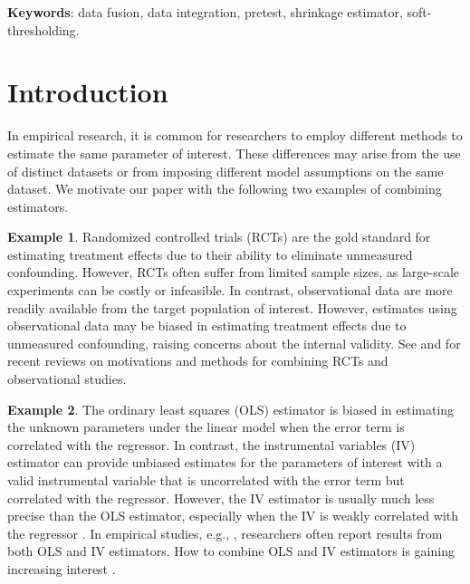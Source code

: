 \documentclass[11pt]{article}
\numberwithin{equation}{section}
\theoremstyle{definition}
\newtheorem{example}{Example}[section]
\begin{document}
{\bf Keywords}: data fusion, data integration, pretest, shrinkage estimator, soft-thresholding.


\section{Introduction}

In empirical research, it is common for researchers to employ different methods to estimate the same parameter of interest. These differences may arise from the use of distinct datasets or from imposing different model assumptions on the same dataset. We motivate our paper with the following two examples of combining estimators.
\begin{example}\label{ex:treatment}
  Randomized controlled trials (RCTs) are the gold standard for estimating treatment effects due to their ability to eliminate unmeasured confounding. However, RCTs often suffer from limited sample sizes, as large-scale experiments can be costly or infeasible. In contrast, observational data are more readily available from the target population of interest. However, estimates using observational data may be biased in estimating treatment effects due to unmeasured confounding, raising concerns about the internal validity. See \cite{brantner2023methods} and \cite{colnet2024causal} for recent reviews on motivations and methods for combining RCTs and observational studies.
\end{example}

\begin{example}\label{ex:regression}
  The ordinary least squares (OLS) estimator is biased in estimating the unknown parameters under the linear model when the error term is correlated with the regressor. In contrast, the instrumental variables (IV) estimator can provide unbiased estimates for the parameters of interest with a valid instrumental variable that is uncorrelated with the error term but correlated with the regressor. However, the IV estimator is usually much less precise than the OLS estimator, especially when the IV is weakly correlated with the regressor \citep{bound1995problems}. In empirical studies, e.g., \cite{angrist1991does}, researchers often report results from both OLS and IV estimators. How to combine OLS and IV estimators is gaining increasing interest \citep{armstrong2025adapting}.
\end{example}
\end{document}
